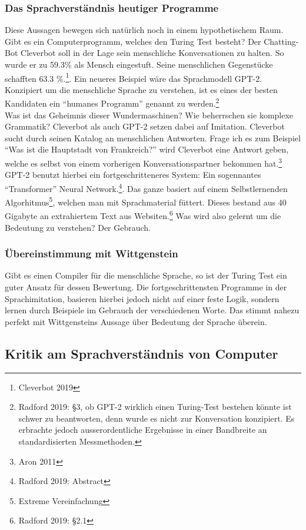 \documentclass[10pt,a4paper]{article}
\begin{document}
\subsubsection{Das Sprachverständnis heutiger Programme}
Diese Aussagen bewegen sich natürlich noch in einem hypothetischem Raum. Gibt es ein Computerprogramm, welches den Turing Test besteht? Der Chatting-Bot Cleverbot soll in der Lage sein menschliche Konversationen zu halten. So wurde er zu 59.3\% als Mensch eingestuft. Seine menschlichen Gegenstücke schafften 63.3 \%.\footnote{Cleverbot 2019}. Ein neueres Beispiel wäre das Sprachmodell GPT-2. Konzipiert um die menschliche Sprache zu verstehen, ist es eines der besten Kandidaten ein \enquote{humanes Programm} genannt zu werden.\footnote{Radford 2019: §3, ob GPT-2 wirklich einen Turing-Test bestehen könnte ist schwer zu beantworten, denn wurde es nicht zur Konversation konzipiert. Es erbrachte jedoch ausserordentliche Ergebnisse in einer Bandbreite an standardisierten Messmethoden.} \\
Was ist das Geheimnis dieser Wundermaschinen? Wie beherrschen sie komplexe Grammatik? Cleverbot als auch GPT-2 setzen dabei auf Imitation. Cleverbot sucht durch seinen Katalog an menschlichen Antworten. Frage ich es zum Beispiel \enquote{Was ist die Hauptstadt von Frankreich?} wird Cleverbot eine Antwort geben, welche es selbst von einem vorherigen Konversationspartner bekommen hat.\footnote{Aron 2011} GPT-2 benutzt hierbei ein fortgeschritteneres System: Ein sogennantes \enquote{Transformer} Neural Network.\footnote{Radford 2019: Abstract}. Das ganze basiert auf einem Selbstlernenden Algorhitmus\footnote{Extreme Vereinfachung}, welchen man mit Sprachmaterial füttert. Dieses bestand aus 40 Gigabyte an extrahiertem Text aus Websiten.\footnote{Radford 2019: §2.1} Was wird also gelernt um die Bedeutung zu verstehen? Der Gebrauch.

\subsubsection{Übereinstimmung mit Wittgenstein}
Gibt es einen Compiler für die menschliche Sprache, so ist der Turing Test ein guter Ansatz für dessen Bewertung. Die fortgeschrittensten Programme in der Sprachimitation, basieren hierbei jedoch nicht auf einer feste Logik, sondern lernen durch Beispiele im Gebrauch der verschiedenen Worte. Das stimmt nahezu perfekt mit Wittgensteins Aussage über Bedeutung der Sprache überein.

\subsection{Kritik am Sprachverständnis von Computer}
\end{document}
